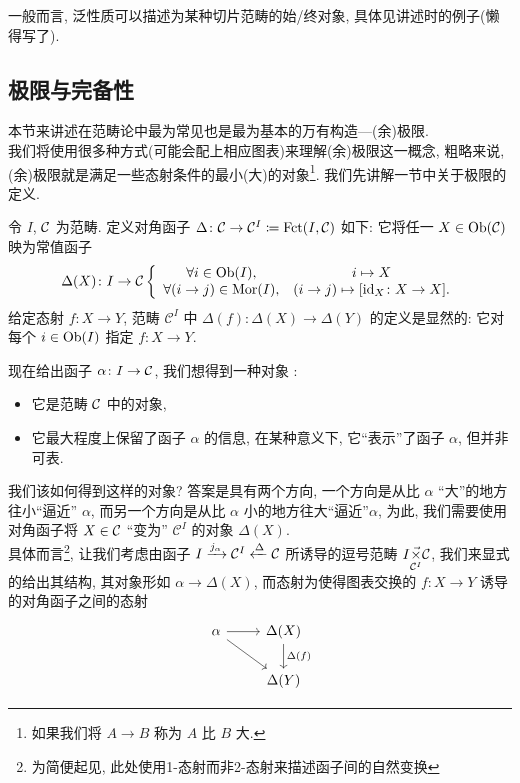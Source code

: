 一般而言, 泛性质可以描述为某种切片范畴的始/终对象, 具体见讲述时的例子(懒得写了).
\subsection{极限与完备性}
本节来讲述在范畴论中最为常见也是最为基本的万有构造---(余)极限.\\
我们将使用很多种方式(可能会配上相应图表)来理解(余)极限这一概念, 粗略来说, (余)极限就是满足一些态射条件的最小(大)的对象\footnote{如果我们将 $A \to B$ 称为 $A$ 比 $B$ 大.}. 我们先讲解\cite[$\S$ 2.7 极限]{李文威卷一}一节中关于极限的定义.
\begin{definition}
    令 $I$, $\cal{C}$ 为范畴. 定义对角函子 $\Delta \colon \mathcal{C} \to \mathcal{C}^I \coloneqq \operatorname{Fct}(I,\cal{C})$ 如下: 它将任一 $X \in \operatorname{Ob}(\cal{C})$ 映为常值函子
    \[
    \Delta(X) \colon I \to \mathcal{C} 
    \left\{
    \begin{array}{ccc}
        \forall i\in \operatorname{Ob}(I), &  i \mapsto X\\
         \forall (i\to j) \in \operatorname{Mor}(I),& (i\to j) \mapsto [\mathrm{id}_X\colon X \to X]. 
    \end{array}
    \right.
    \]
    给定态射 $f \colon X \to Y$, 范畴 $\mathcal{C}^I$ 中 $\Delta(f) \colon \Delta(X) \to \Delta(Y)$ 的定义是显然的: 它对每个 $i\in \operatorname{Ob}(I)$ 指定 $f \colon X \to Y$.
\end{definition}
现在给出函子 $\alpha \colon I\to \cal{C}$, 我们想得到一种对象 : 
\begin{itemize}
    \item 它是范畴 $\cal{C}$ 中的对象,
    \item 它最大程度上保留了函子 $\alpha$ 的信息, 在某种意义下, 它``表示''了函子 $\alpha$, 但并非可表.
\end{itemize}
我们该如何得到这样的对象? 答案是具有两个方向, 一个方向是从比 $\alpha$ ``大''的地方往小``逼近'' $\alpha$, 而另一个方向是从比 $\alpha$ 小的地方往大``逼近''$\alpha$, 为此, 我们需要使用对角函子将 $X \in \cal{C}$ ``变为'' $\mathcal{C}^I$ 的对象 $\Delta(X)$. \\
具体而言\footnote{为简便起见, 此处使用1-态射而非2-态射来描述函子间的自然变换}, 让我们考虑由函子 $I \xrightarrow{j_{\alpha}} \mathcal{C}^I \xleftarrow{\Delta} \cal{C}$ 所诱导的逗号范畴 $I \vec{\underset{\mathcal{C}^I}{\times}}\cal{C}$, 我们来显式的给出其结构, 其对象形如 $\alpha \to \Delta(X)$, 而态射为使得图表交换的 $f \colon X \to Y$ 诱导的对角函子之间的态射
\[\begin{tikzcd}
	\alpha & {\Delta(X)} \\
	& {\Delta(Y)}
	\arrow[from=1-1, to=1-2]
	\arrow[from=1-1, to=2-2]
	\arrow["{\Delta(f)}", from=1-2, to=2-2]
\end{tikzcd}\]
